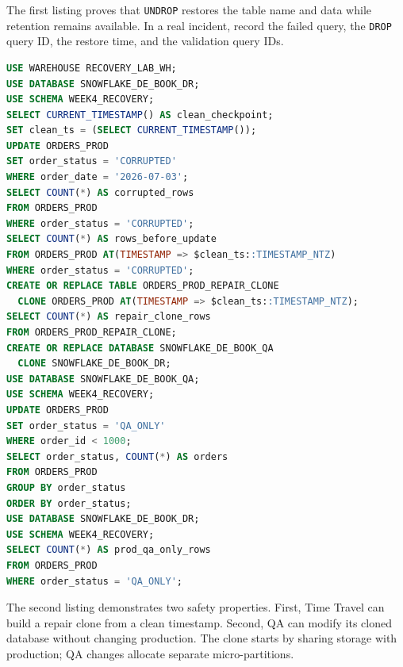 The first listing proves that \texttt{UNDROP} restores the table name and data while retention remains available. In a real incident, record the failed query, the \texttt{DROP} query ID, the restore time, and the validation query IDs.
\begin{lstlisting}[language=SQL,caption={Using AT and BEFORE clauses and creating a zero-copy QA clone.},label={lst:chapter4-clone-time-travel-sql}]
USE WAREHOUSE RECOVERY_LAB_WH;
USE DATABASE SNOWFLAKE_DE_BOOK_DR;
USE SCHEMA WEEK4_RECOVERY;
SELECT CURRENT_TIMESTAMP() AS clean_checkpoint;
SET clean_ts = (SELECT CURRENT_TIMESTAMP());
UPDATE ORDERS_PROD
SET order_status = 'CORRUPTED'
WHERE order_date = '2026-07-03';
SELECT COUNT(*) AS corrupted_rows
FROM ORDERS_PROD
WHERE order_status = 'CORRUPTED';
SELECT COUNT(*) AS rows_before_update
FROM ORDERS_PROD AT(TIMESTAMP => $clean_ts::TIMESTAMP_NTZ)
WHERE order_status = 'CORRUPTED';
CREATE OR REPLACE TABLE ORDERS_PROD_REPAIR_CLONE
  CLONE ORDERS_PROD AT(TIMESTAMP => $clean_ts::TIMESTAMP_NTZ);
SELECT COUNT(*) AS repair_clone_rows
FROM ORDERS_PROD_REPAIR_CLONE;
CREATE OR REPLACE DATABASE SNOWFLAKE_DE_BOOK_QA
  CLONE SNOWFLAKE_DE_BOOK_DR;
USE DATABASE SNOWFLAKE_DE_BOOK_QA;
USE SCHEMA WEEK4_RECOVERY;
UPDATE ORDERS_PROD
SET order_status = 'QA_ONLY'
WHERE order_id < 1000;
SELECT order_status, COUNT(*) AS orders
FROM ORDERS_PROD
GROUP BY order_status
ORDER BY order_status;
USE DATABASE SNOWFLAKE_DE_BOOK_DR;
USE SCHEMA WEEK4_RECOVERY;
SELECT COUNT(*) AS prod_qa_only_rows
FROM ORDERS_PROD
WHERE order_status = 'QA_ONLY';
\end{lstlisting}
The second listing demonstrates two safety properties. First, Time Travel can build a repair clone from a clean timestamp. Second, QA can modify its cloned database without changing production. The clone starts by sharing storage with production; QA changes allocate separate micro-partitions.

